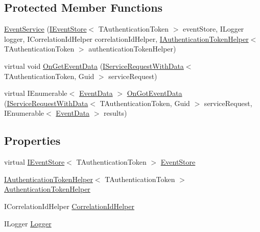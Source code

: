 \subsection*{Protected Member Functions}
\begin{DoxyCompactItemize}
\item 
\hyperlink{classCqrs_1_1Services_1_1EventService_ac5896c2eb4efbdb42b3cad774b688e45}{Event\+Service} (\hyperlink{interfaceCqrs_1_1Events_1_1IEventStore}{I\+Event\+Store}$<$ T\+Authentication\+Token $>$ event\+Store, I\+Logger logger, I\+Correlation\+Id\+Helper correlation\+Id\+Helper, \hyperlink{interfaceCqrs_1_1Authentication_1_1IAuthenticationTokenHelper}{I\+Authentication\+Token\+Helper}$<$ T\+Authentication\+Token $>$ authentication\+Token\+Helper)
\item 
virtual void \hyperlink{classCqrs_1_1Services_1_1EventService_a1556310c97fbf05df7804d53f91f8511}{On\+Get\+Event\+Data} (\hyperlink{interfaceCqrs_1_1Services_1_1IServiceRequestWithData}{I\+Service\+Request\+With\+Data}$<$ T\+Authentication\+Token, Guid $>$ service\+Request)
\item 
virtual I\+Enumerable$<$ \hyperlink{classCqrs_1_1Events_1_1EventData}{Event\+Data} $>$ \hyperlink{classCqrs_1_1Services_1_1EventService_a16030e800b05cea77fd2183db7296804}{On\+Got\+Event\+Data} (\hyperlink{interfaceCqrs_1_1Services_1_1IServiceRequestWithData}{I\+Service\+Request\+With\+Data}$<$ T\+Authentication\+Token, Guid $>$ service\+Request, I\+Enumerable$<$ \hyperlink{classCqrs_1_1Events_1_1EventData}{Event\+Data} $>$ results)
\end{DoxyCompactItemize}
\subsection*{Properties}
\begin{DoxyCompactItemize}
\item 
virtual \hyperlink{interfaceCqrs_1_1Events_1_1IEventStore}{I\+Event\+Store}$<$ T\+Authentication\+Token $>$ \hyperlink{classCqrs_1_1Services_1_1EventService_a07e516aae58050ab225f5ce5f1830ff6}{Event\+Store}
\item 
\hyperlink{interfaceCqrs_1_1Authentication_1_1IAuthenticationTokenHelper}{I\+Authentication\+Token\+Helper}$<$ T\+Authentication\+Token $>$ \hyperlink{classCqrs_1_1Services_1_1EventService_a7da2e2ec8d77d5972cea45a7ad482f39}{Authentication\+Token\+Helper}
\item 
I\+Correlation\+Id\+Helper \hyperlink{classCqrs_1_1Services_1_1EventService_a1c12d11de253a85f7257c412bca1532b}{Correlation\+Id\+Helper}
\item 
I\+Logger \hyperlink{classCqrs_1_1Services_1_1EventService_acd30fea6829b27ee802126c36f8875b4}{Logger}
\end{DoxyCompactItemize}


